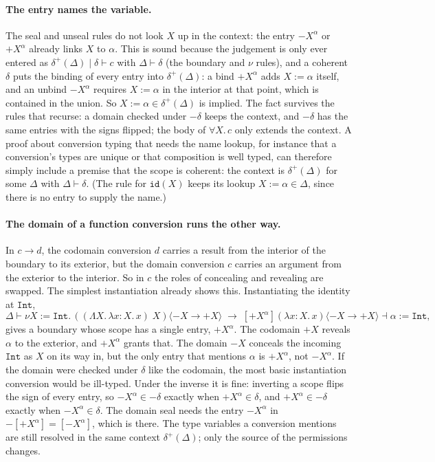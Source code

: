 \documentclass[acmsmall,screen,review,anonymous,nonacm]{acmart}
\newcommand{\id}[1]{\key{id}(#1)}
\newcommand{\dual}[1]{-#1}
\newcommand{\seal}[1]{-#1}
\newcommand{\unseal}[1]{+#1}
\newcommand{\becomes}{\longrightarrow}
\newcommand{\of}{{:}}
\newcommand{\tu}{{\to}}
\newcommand{\lam}[1]{\lambda #1 \dotspace}
\newcommand{\Lam}[1]{\Lambda #1 \dotspace}
\newcommand{\all}[1]{\forall #1 \dotspace}
\newcommand{\app}{\;}
\newcommand{\Int}{\key{Int}}
\newcommand{\by}{{:=}}
\newcommand{\key}[1]{\mathtt{#1}}
\newcommand{\dotspace}{.\,}
\newcommand{\nuinst}[4]{\nu #1\by #2 \dotspace (#3 \app #1) \langle #4 \rangle}
\newcommand{\boundry}[3]{\left[#2\right] #1 \langle #3 \rangle}
\begin{document}
\paragraph{The entry names the variable.}
The seal and unseal rules do not look $X$ up in the context: the entry
${-X}^\alpha$ or ${+X}^\alpha$ already links $X$ to $\alpha$.  This is
sound because the judgement is only ever entered as
$\delta^{+}(\Delta) \mid \delta \vdash c$ with $\Delta \vdash \delta$
(the boundary and $\nu$ rules), and a coherent $\delta$ puts the binding
of every entry into $\delta^{+}(\Delta)$: a bind ${+X}^\alpha$ adds
$X \by \alpha$ itself, and an unbind ${-X}^\alpha$ requires
$X \by \alpha$ in the interior at that point, which is contained in the
union.  So $X \by \alpha \in \delta^{+}(\Delta)$ is implied.  The fact
survives the rules that recurse: a domain checked under $\dual{\delta}$
keeps the context, and $\dual{\delta}$ has the same entries with the
signs flipped; the body of $\all{X} c$ only extends the context.  A
proof about conversion typing that needs the name lookup, for instance
that a conversion's types are unique or that composition is well
typed, can therefore simply include a premise that the scope is
coherent: the context is $\delta^{+}(\Delta)$ for some $\Delta$ with
$\Delta \vdash \delta$.  (The rule for $\id{X}$ keeps its lookup
$X \by \alpha \in \Delta$, since there is no entry to supply the name.)

\paragraph{The domain of a function conversion runs the other way.}
In $c \tu d$, the codomain conversion $d$ carries a result from the
interior of the boundary to its exterior, but the domain conversion $c$
carries an argument from the exterior to the interior.  So in $c$ the
roles of concealing and revealing are swapped.  The simplest
instantiation already shows this.  Instantiating the identity at
$\Int$,
\[
  \Delta \vdash \nuinst{X}{\Int}{(\Lam{X}\lam{x \of X} x)}{\seal{X} \tu \unseal{X}}
  \;\becomes\;
  \boundry{(\lam{x \of X} x)}{{+X}^\alpha}{\seal{X} \tu \unseal{X}}
  \dashv \alpha \by \Int ,
\]
gives a boundary whose scope has a single entry, ${+X}^\alpha$.  The
codomain $\unseal{X}$ reveals $\alpha$ to the exterior, and ${+X}^\alpha$
grants that.  The domain $\seal{X}$ conceals the incoming $\Int$ as $X$
on its way in, but the only entry that mentions $\alpha$ is
${+X}^\alpha$, not ${-X}^\alpha$.  If the domain were checked under
$\delta$ like the codomain, the most basic instantiation conversion
would be ill-typed.  Under the inverse it is fine: inverting a scope
flips the sign of every entry, so ${-X}^\alpha \in \dual{\delta}$
exactly when ${+X}^\alpha \in \delta$, and ${+X}^\alpha \in \dual{\delta}$
exactly when ${-X}^\alpha \in \delta$.  The domain seal needs the entry
${-X}^\alpha$ in $\dual{[{+X}^\alpha]} = [{-X}^\alpha]$, which is
there.  The type variables a conversion mentions are still
resolved in the same context $\delta^{+}(\Delta)$; only the source of
the permissions changes.
\end{document}
